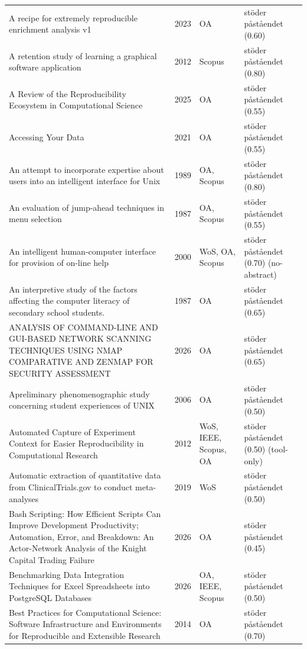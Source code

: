 \begin{longtable}{@{}%
  >{\raggedright\arraybackslash}p{}c%
  >{\raggedright\arraybackslash}p{}%
  >{\raggedright\arraybackslash}p{}@{}}
A recipe for extremely reproducible enrichment analysis v1 & 2023 & OA & stöder påståendet (0.60) \\
A retention study of learning a graphical software application & 2012 & Scopus & stöder påståendet (0.80) \\
A Review of the Reproducibility Ecosystem in Computational Science & 2025 & OA & stöder påståendet (0.55) \\
Accessing Your Data & 2021 & OA & stöder påståendet (0.55) \\
An attempt to incorporate expertise about users into an intelligent interface for Unix & 1989 & OA, Scopus & stöder påståendet (0.80) \\
An evaluation of jump-ahead techniques in menu selection & 1987 & OA, Scopus & stöder påståendet (0.55) \\
An intelligent human-computer interface for provision of on-line help & 2000 & WoS, OA, Scopus & stöder påståendet (0.70) (no-abstract) \\
An interpretive study of the factors affecting the computer literacy of secondary school students. & 1987 & OA & stöder påståendet (0.65) \\
ANALYSIS OF COMMAND-LINE AND GUI-BASED NETWORK SCANNING TECHNIQUES USING NMAP COMPARATIVE AND ZENMAP FOR SECURITY ASSESSMENT & 2026 & OA & stöder påståendet (0.65) \\
Apreliminary phenomenographic study concerning student experiences of UNIX & 2006 & OA & stöder påståendet (0.50) \\
Automated Capture of Experiment Context for Easier Reproducibility in Computational Research & 2012 & WoS, IEEE, Scopus, OA & stöder påståendet (0.50) (tool-only) \\
Automatic extraction of quantitative data from ClinicalTrials.gov to conduct meta-analyses & 2019 & WoS & stöder påståendet (0.50) \\
Bash Scripting: How Efficient Scripts Can Improve Development Productivity; Automation, Error, and Breakdown: An Actor-Network Analysis of the Knight Capital Trading Failure & 2026 & OA & stöder påståendet (0.45) \\
Benchmarking Data Integration Techniques for Excel Spreadsheets into PostgreSQL Databases & 2026 & OA, IEEE, Scopus & stöder påståendet (0.50) \\
Best Practices for Computational Science: Software Infrastructure and Environments for Reproducible and Extensible Research & 2014 & OA & stöder påståendet (0.70) \\

\end{longtable}
